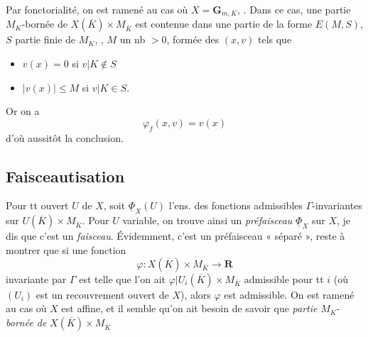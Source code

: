 \documentclass[11pt,a4paper]{article}
\begin{document}
Par fonctorialité, on est ramené au cas où $X = \mathbf{G}_{m,K}$,
 . Dans ce
cas,  une partie $M_K$-bornée de
$X(\overline{K}) \times M_{\overline{K}}$
 est contenue dans une partie
de la forme $E(M, S)$, $S$ partie finie de $M_K$, ,
$M$ un nb $> 0$, formée des $(x, v)$ tels que
\begin{itemize}
  \item[a)] $v(x) = 0$ \struck{\ill{}}  si
  $v|K \notin S$
  \item[b)] \struck{\ill{}} $|v(x)| \leqslant M$ si $v|K \in S$.
\end{itemize}

Or on a
\[
  \varphi_f(x, v) = v(x)
\]
\struck{\ill{}} d'où aussitôt la conclusion.

\subsection{Faisceautisation}

Pour tt ouvert $U$ de $X$, soit $\underline{\Phi}_X(U)$ l'ens. des fonctions
admissibles $\Gamma$-invariantes sur $U(\overline{K}) \times M_{\overline{K}}$.
Pour $U$ variable, on trouve ainsi un \emph{préfaisceau}
$\underline{\Phi}_X$ sur $X$, je dis que c'est un \emph{faisceau}.
Évidemment, c'est un préfaisceau « séparé », reste à montrer que si une
fonction
\[
  \varphi : X(\overline{K}) \times M_{\overline{K}} \to \mathbf{R}
\]
invariante par $\Gamma$ est telle que l'on ait
$\varphi | U_i(\overline{K}) \times M_{\overline{K}}$ admissible pour tt
$i$ (où $(U_i)$ est un recouvrement ouvert de $X$), alors $\varphi$ est
admissible. On est ramené au cas où $X$ est affine, et il semble qu'on ait
besoin de savoir que  
\emph{partie} $M_K$-\emph{bornée de} $X(\overline{K}) \times M_{\overline{K}}$
\end{document}
